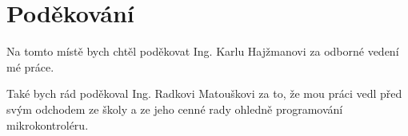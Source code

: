 \section*{Poděkování}
Na tomto místě bych chtěl poděkovat Ing. Karlu Hajžmanovi za odborné vedení
mé práce.

Také bych rád poděkoval Ing. Radkovi Matouškovi za to, že mou práci vedl před
svým odchodem ze školy a ze jeho cenné rady ohledně programování
mikrokontroléru.
